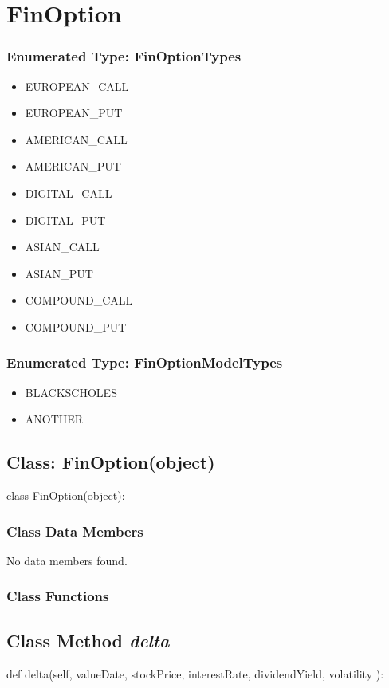 \documentclass[twoside,11pt]{book}
\begin{document}
\newpage
\section{FinOption}

\subsubsection{Enumerated Type: FinOptionTypes}
\begin{itemize}
\item{EUROPEAN\_CALL}
\item{EUROPEAN\_PUT}
\item{AMERICAN\_CALL}
\item{AMERICAN\_PUT}
\item{DIGITAL\_CALL}
\item{DIGITAL\_PUT}
\item{ASIAN\_CALL}
\item{ASIAN\_PUT}
\item{COMPOUND\_CALL}
\item{COMPOUND\_PUT}
\end{itemize}

\subsubsection{Enumerated Type: FinOptionModelTypes}
\begin{itemize}
\item{BLACKSCHOLES}
\item{ANOTHER}
\end{itemize}

\subsection{Class: FinOption(object)}
class FinOption(object):

\subsubsection{Class Data Members}
No data members found.

\subsubsection{Class Functions}

\subsection{Class Method {\it delta}}
def delta(self, valueDate, stockPrice, interestRate, dividendYield, volatility ):
\end{document}
